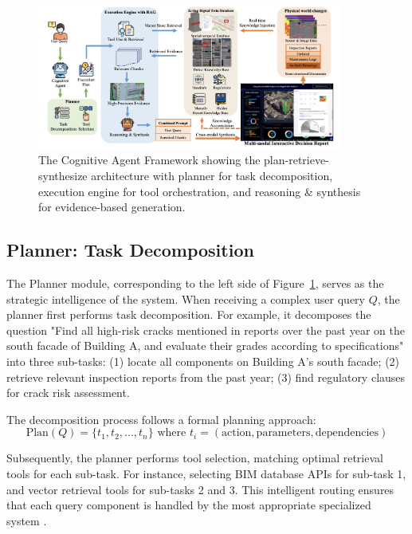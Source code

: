 \begin{figure}[htbp]
\centering
\includegraphics[width=0.9\textwidth]{figures/DefectGPT/cognitive_agent_framework.png}
\caption{The Cognitive Agent Framework showing the plan-retrieve-synthesize architecture with planner for task decomposition, execution engine for tool orchestration, and reasoning \& synthesis for evidence-based generation.}
\label{fig:cognitive-agent-framework}
\end{figure}

\subsection{Planner: Task Decomposition}

The Planner module, corresponding to the left side of Figure~\ref{fig:cognitive-agent-framework}, serves as the strategic intelligence of the system. When receiving a complex user query $Q$, the planner first performs task decomposition. For example, it decomposes the question "Find all high-risk cracks mentioned in reports over the past year on the south facade of Building A, and evaluate their grades according to specifications" into three sub-tasks: (1) locate all components on Building A's south facade; (2) retrieve relevant inspection reports from the past year; (3) find regulatory clauses for crack risk assessment.

The decomposition process follows a formal planning approach:
\begin{equation}
\text{Plan}(Q) = \{t_1, t_2, ..., t_n\} \text{ where } t_i = (\text{action}, \text{parameters}, \text{dependencies})
\end{equation}

Subsequently, the planner performs tool selection, matching optimal retrieval tools for each sub-task. For instance, selecting BIM database APIs for sub-task 1, and vector retrieval tools for sub-tasks 2 and 3. This intelligent routing ensures that each query component is handled by the most appropriate specialized system \cite{yao2022react}.

